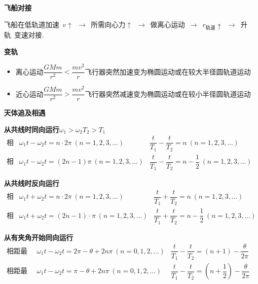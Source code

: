 \textbf{飞船对接}

飞船在低轨道加速\ $v\uparrow$\ $\to$\ 所需向心力$\uparrow$\ $\to$\ 做离心运动\ $\to$\ $r_{\text{轨道}}\uparrow$\ $\to$\ 升轨\ 变速对接.

\textbf{变轨}
\begin{itemize}
\item 离心运动\quad $\dfrac{GMm}{r^{2}}<\dfrac{mv^{2}}{r}$\quad 飞行器突然加速\quad 变为椭圆运动或在较大半径圆轨道运动
\item 近心运动\quad $\dfrac{GMm}{r^{2}}>\dfrac{mv^{2}}{r}$\quad 飞行器突然减速\quad 变为椭圆运动或在较小半径圆轨道运动
\end{itemize}
\textbf{天体追及相遇}

\textbf{从共线时同向运行}\quad $\omega_1>\omega_2$\quad $T_2>T_1$
\[
\begin{array}{lll}
\text{相距最近} & \omega_1t-\omega_2t=n\cdot2\pi\ (n=1,2,3,\ldots) & \dfrac{t}{T_1}-\dfrac{t}{T_2}=n\ (n=1,2,3,\ldots)\\[10pt]
\text{相距最远} & \omega_1t-\omega_2t=(2n-1)\pi\ (n=1,2,3,\ldots) & \dfrac{t}{T_1}-\dfrac{t}{T_2}=n-\dfrac{1}{2}\ (n=1,2,3,\ldots)
\end{array}
\]

\textbf{从共线时反向运行}
\[
\begin{array}{lll}
\text{相距最近} & \omega_1t+\omega_2t=n\cdot2\pi\ (n=1,2,3,\ldots) & \dfrac{t}{T_1}+\dfrac{t}{T_2}=n\ (n=1,2,3,\ldots)\\[10pt]
\text{相距最远} & \omega_1t+\omega_2t=(2n-1)\cdot\pi\ (n=1,2,3,\ldots) & \dfrac{t}{T_1}+\dfrac{t}{T_2}=n-\dfrac{1}{2}\ (n=1,2,3,\ldots)
\end{array}
\]

\textbf{从有夹角开始同向运行}
\[
\begin{array}{lll}
\text{相距最近} & \omega_1t-\omega_2t=2\pi-\theta+2n\pi\ (n=0,1,2,\ldots) & \dfrac{t}{T_1}-\dfrac{t}{T_2}=(n+1)-\dfrac{\theta}{2\pi}\\[10pt]
\text{相距最远} & \omega_1t-\omega_2t=\pi-\theta+2n\pi\ (n=0,1,2,\ldots) & \dfrac{t}{T_1}-\dfrac{t}{T_2}=\left(n+\dfrac{1}{2}\right)-\dfrac{\theta}{2\pi}
\end{array}
\]

